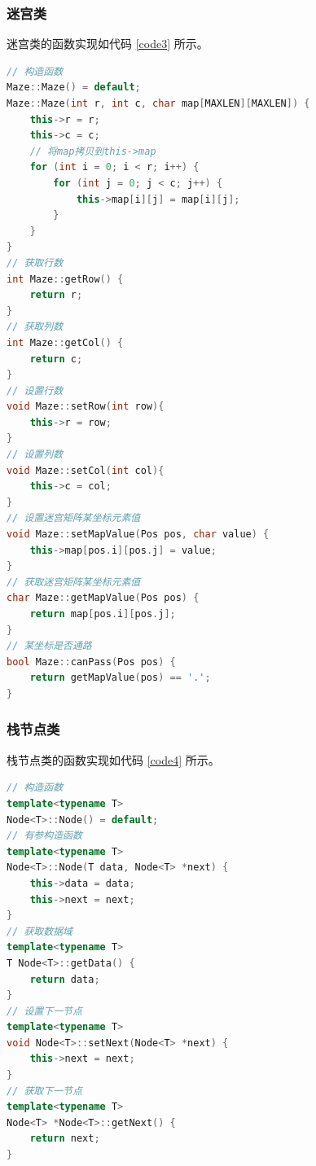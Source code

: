 \documentclass{ctexart}
\begin{document}
    \subsubsection{迷宫类}
    迷宫类的函数实现如代码 \ref{code3} 所示。
\begin{lstlisting}[language=C++,caption=Maze类的实现,label=code3]
// 构造函数
Maze::Maze() = default;
Maze::Maze(int r, int c, char map[MAXLEN][MAXLEN]) {
    this->r = r;
    this->c = c;
    // 将map拷贝到this->map
    for (int i = 0; i < r; i++) {
        for (int j = 0; j < c; j++) {
            this->map[i][j] = map[i][j];
        }
    }
}
// 获取行数
int Maze::getRow() {
    return r;
}
// 获取列数
int Maze::getCol() {
    return c;
}
// 设置行数
void Maze::setRow(int row){
    this->r = row;
}
// 设置列数
void Maze::setCol(int col){
    this->c = col;
}
// 设置迷宫矩阵某坐标元素值
void Maze::setMapValue(Pos pos, char value) {
    this->map[pos.i][pos.j] = value;
}
// 获取迷宫矩阵某坐标元素值
char Maze::getMapValue(Pos pos) {
    return map[pos.i][pos.j];
}
// 某坐标是否通路
bool Maze::canPass(Pos pos) {
    return getMapValue(pos) == '.';
}
\end{lstlisting}

    \subsubsection{栈节点类}
    栈节点类的函数实现如代码 \ref{code4} 所示。
\begin{lstlisting}[language=C++,caption=Node类的实现,label=code4]
// 构造函数
template<typename T>
Node<T>::Node() = default;
// 有参构造函数
template<typename T>
Node<T>::Node(T data, Node<T> *next) {
    this->data = data;
    this->next = next;
}
// 获取数据域
template<typename T>
T Node<T>::getData() {
    return data;
}
// 设置下一节点
template<typename T>
void Node<T>::setNext(Node<T> *next) {
    this->next = next;
}
// 获取下一节点
template<typename T>
Node<T> *Node<T>::getNext() {
    return next;
}
\end{lstlisting}
\end{document}
